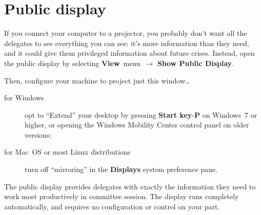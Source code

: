 \documentclass{article}
\newcommand{\navstep}[2]{\navitem{#1}~{#2}~$\rightarrow$}
\newcommand{\navitem}[1]{\textbf{#1}}
\begin{document}
\section{Public display}
\label{sec:public-display}

If you connect your computer to a projector, you probably don't want all the delegates to see everything you can see: it's more information than they need, and it could give them privileged information about future crises.
Instead, open the public display by selecting \navstep{View}{menu} \navitem{Show Public Display}.

Then, configure your machine to project just this window\ldots
\begin{description}
  \item[for Windows]
    opt to ``Extend'' your desktop by pressing \navitem{Start key}-\navitem{P} on Windows~7 or higher, or opening the Windows Mobility Center control panel on older versions;
  \item[for Mac~OS or most Linux distributions]
    turn off ``mirroring'' in the \navitem{Displays} system preference pane.
\end{description}

The public display provides delegates with exactly the information they need to work most productively in committee session.
The display runs completely automatically, and requires no configuration or control on your part.
\end{document}
